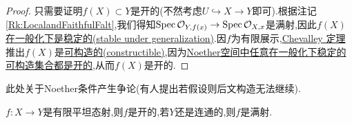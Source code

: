 \begin{proof}
    只需要证明$f(X)\subset Y$是开的(不然考虑$U \hookrightarrow X \to Y$即可).根据注记\ref{Rk:LocalandFaithfulFalt},我们得知$\operatorname{Spec} \mathcal{O}_{Y,f(x)} \to \operatorname{Spec} \mathcal{O}_{X,x}$是满射,因此$f(X)$\href{https://stacks.math.columbia.edu/tag/0061}{在一般化下是稳定的(stable under generalization)}.因$f$为有限展示,\href{https://stacks.math.columbia.edu/tag/00FE}{Chevalley 定理}推出$f(X)$是\href{https://stacks.math.columbia.edu/tag/005G}{可构造的(constructible)},因为\href{https://stacks.math.columbia.edu/tag/0542}{Noether空间中任意在一般化下稳定的可构造集合都是开的},从而$f(X)$是开的.
\end{proof}
\begin{remark}
    此处关于Noether条件产生争论(有人提出若假设则后文构造无法继续).
\end{remark}
\begin{corollary}
    $f : X\to Y$是有限平坦态射,则$f$是开的,若$Y$还是连通的,则$f$是满射.
\end{corollary}
